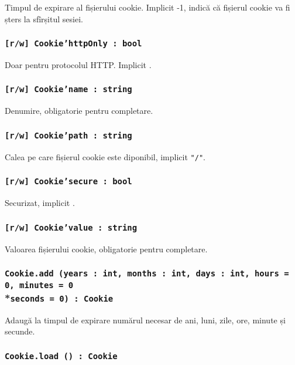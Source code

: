 Timpul de expirare al fișierului cookie. Implicit -1, indică că fișierul cookie va fi șters la sfîrșitul sesiei.

\subsubsection{\texttt{[r/w] Cookie'httpOnly : bool}}

Doar pentru protocolul HTTP. Implicit \false.

\subsubsection{\texttt{[r/w] Cookie'name : string}}

Denumire, obligatorie pentru completare.

\subsubsection{\texttt{[r/w] Cookie'path : string}}

Calea pe care fișierul cookie este diponibil, implicit \texttt{"/"}.

\subsubsection{\texttt{[r/w] Cookie'secure : bool}}

Securizat, implicit \false.

\subsubsection{\texttt{[r/w] Cookie'value : string}}

Valoarea fișierului cookie, obligatorie pentru completare.

\subsubsection{\texttt{Cookie.add (years : int, months : int, days : int, hours = 0, minutes = 0}\\*\noindent\texttt{seconds = 0) : Cookie}}

Adaugă la timpul de expirare numărul necesar de ani, luni, zile, ore, minute și secunde.

\subsubsection{\texttt{Cookie.load () : Cookie}}

